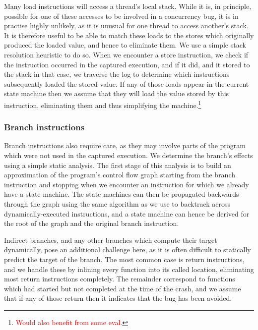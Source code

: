 \documentclass[10pt,twocolumn,preprint,natbib,authoryear]{sigplanconf}
\newcommand{\editorial}[1]{\textcolor{red}{\footnote{\textcolor{red}{#1}}}}
\begin{document}
Many load instructions will access a thread's local stack.  While it
is, in principle, possible for one of these accesses to be involved in
a concurrency bug, it is in practise highly unlikely, as it is unusual
for one thread to access another's stack.  It is therefore useful to
be able to match these loads to the stores which originally produced
the loaded value, and hence to eliminate them.  We use a simple stack
resolution heuristic to do so.  When we encounter a store instruction,
we check if the instruction occurred in the captured execution, and if
it did, and it stored to the stack in that case, we traverse the log
to determine which instructions subsequently loaded the stored value.
If any of those loads appear in the current state machine then we
assume that they will load the value stored by this instruction,
eliminating them and thus simplifying the machine.\editorial{Would
  also benefit from some eval.}

\subsubsection{Branch instructions}
\label{sect:branch_instrs}
Branch instructions also require care, as they may involve parts of
the program which were not used in the captured execution.  We
determine the branch's effects using a simple static analysis.  The
first stage of this analysis is to build an approximation of the
program's control flow graph starting from the branch instruction and
stopping when we encounter an instruction for which we already have a
state machine.  The state machines can then be propagated backwards
through the graph using the same algorithm as we use to backtrack
across dynamically-executed instructions, and a state machine can
hence be derived for the root of the graph and the original branch
instruction.

Indirect branches, and any other branches which compute their target
dynamically, pose an additional challenge here, as it is often
difficult to statically predict the target of the branch.  The most
common case is return instructions, and we handle these by inlining
every function into its called location, eliminating most return
instructions completely.  The remainder correspond to functions which
had started but not completed at the time of the crash, and we assume
that if any of those return then it indicates that the bug has been
avoided.
\end{document}
